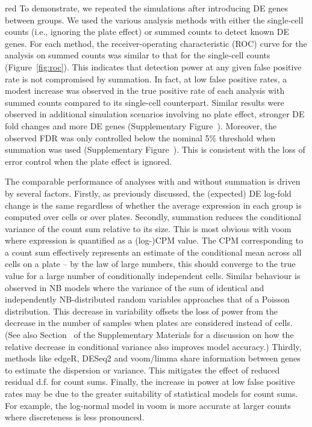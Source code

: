 \documentclass[oupdraft]{bio}
\begin{document}
\begin{color}{red}
To demonstrate, we repeated the simulations after introducing DE genes between groups.
We used the various analysis methods with either the single-cell counts (i.e., ignoring the plate effect) or summed counts to detect known DE genes.
For each method, the receiver-operating characteristic (ROC) curve for the analysis on summed counts was similar to that for the single-cell counts (Figure~\ref{fig:roc}).
This indicates that detection power at any given false positive rate is not compromised by summation.
In fact, at low false positive rates, a modest increase was observed in the true positive rate of each analysis with summed counts compared to its single-cell counterpart.
Similar results were observed in additional simulation scenarios involving no plate effect, stronger DE fold changes and more DE genes (Supplementary Figure~\supppowerroc{}).
Moreover, the observed FDR was only controlled below the nominal 5\% threshold when summation was used (Supplementary Figure~\supppowerfdr{}).
This is consistent with the loss of error control when the plate effect is ignored.

The comparable performance of analyses with and without summation is driven by several factors. 
Firstly, as previously discussed, the (expected) DE log-fold change is the same regardless of whether the average expression in each group is computed over cells or over plates. 
Secondly, summation reduces the conditional variance of the count sum relative to its size.
This is most obvious with voom where expression is quantified as a (log-)CPM value.
The CPM corresponding to a count sum effectively represents an estimate of the conditional mean across all cells on a plate -- by the law of large numbers, this should converge to the true value for a large number of conditionally independent cells.
Similar behaviour is observed in NB models where the variance of the sum of identical and independently NB-distributed random variables approaches that of a Poisson distribution.
This decrease in variability offsets the loss of power from the decrease in the number of samples when plates are considered instead of cells.
(See also Section~\suppmeanvar{} of the Supplementary Materials for a discussion on how the relative decrease in conditional variance also improves model accuracy.)
Thirdly, methods like edgeR, DESeq2 and voom/limma share information between genes to estimate the dispersion or variance. 
This mitigates the effect of reduced residual d.f. for count sums.
Finally, the increase in power at low false positive rates may be due to the greater suitability of statistical models for count sums.
For example, the log-normal model in voom is more accurate at larger counts where discreteness is less pronounced.
\end{color}
\end{document}
